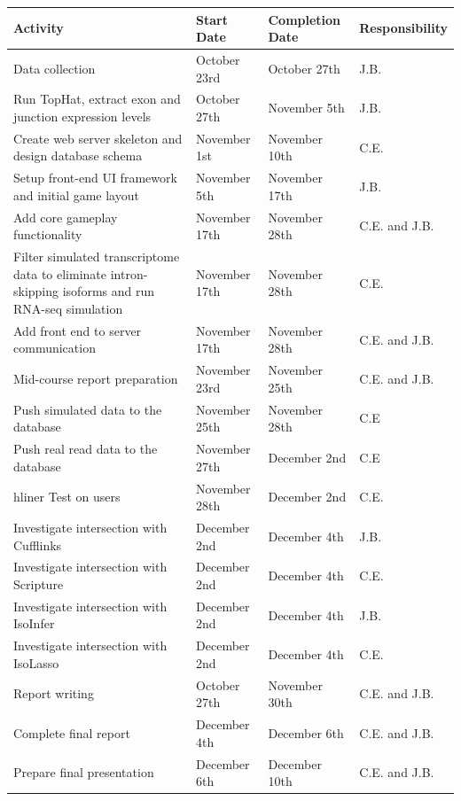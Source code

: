 \documentclass[12pt]{article}
\begin{document}
\begin{tabularx}{\linewidth}{X || l || l || l}
\textbf{Activity} & \textbf{Start Date} & \textbf{Completion Date} & \textbf{Responsibility} \\ 
\hline
Data collection\footnotemark[1] & October 23rd & October 27th & J.B. \\
\hline
Run TopHat, extract exon and junction expression levels\footnotemark[1] & October 27th & November 5th & J.B. \\
\hline
Create web server skeleton and design database schema\footnotemark[1] & November 1st & November 10th & C.E. \\
\hline
Setup front-end UI framework and initial game layout\footnotemark[1] & November 5th & November 17th & J.B. \\
\hline
Add core gameplay functionality\footnotemark[2] & November 17th & November 28th & C.E. and J.B.  \\
\hline
Filter simulated transcriptome data to eliminate intron-skipping isoforms and run RNA-seq simulation\footnotemark[1] & November 17th & November 28th & C.E. \\
\hline
Add front end to server communication\footnotemark[2] & November 17th & November 28th & C.E. and J.B.  \\
\hline
Mid-course report preparation\footnotemark[2] & November 23rd & November 25th & C.E. and J.B. \\
\hline
Push simulated data to the database \footnotemark[2] & November 25th & November 28th & C.E \\
\hline
Push real read data to the database & November 27th & December 2nd & C.E \\
hliner
Test on users & November 28th & December 2nd & C.E. \\
\hline
Investigate intersection with Cufflinks & December 2nd & December 4th & J.B. \\
\hline
Investigate intersection with Scripture & December 2nd & December 4th & C.E. \\
\hline
Investigate intersection with IsoInfer\footnotemark[3] & December 2nd & December 4th & J.B. \\
\hline
Investigate intersection with IsoLasso\footnotemark[3] & December 2nd & December 4th & C.E. \\
\hline
Report writing & October 27th & November 30th & C.E. and J.B. \\
\hline
Complete final report & December 4th & December 6th & C.E. and J.B. \\
\hline
Prepare final presentation & December 6th & December 10th & C.E. and J.B. \\
\end{tabularx}
\end{document}

